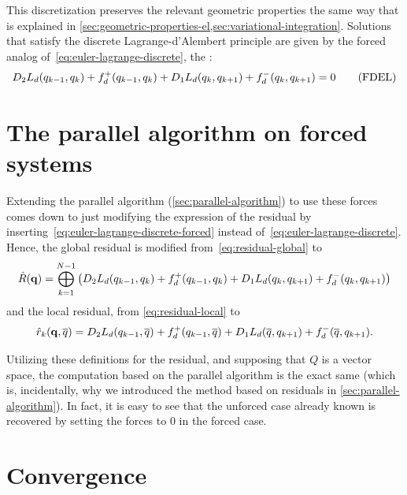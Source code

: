 This discretization preserves the relevant geometric properties the same way that is explained in \cref{sec:geometric-properties-el,sec:variational-integration}.
Solutions that satisfy the discrete Lagrange-d'Alembert principle are given by the forced analog of~\eqref{eq:euler-lagrange-discrete}, the :
\begin{equation}
	D_{2} L_d (q_{k-1}, q_k) + f_d^+ (q_{k-1}, q_k) + D_{1} L_d (q_k, q_{k+1}) + f_d^- (q_k, q_{k+1}) = 0
	\label{eq:euler-lagrange-discrete-forced}
	\tag{FDEL}
\end{equation}

\section{The parallel algorithm on forced systems}

Extending the parallel algorithm (\cref{sec:parallel-algorithm}) to use these forces comes down to just modifying the expression of the residual by inserting~\eqref{eq:euler-lagrange-discrete-forced} instead of~\eqref{eq:euler-lagrange-discrete}. Hence, the global residual is modified from~\eqref{eq:residual-global} to
\begin{equation*}
	\hat{R}(\mathbf{q}) = \bigoplus_{k=1}^{N-1} \left(
	D_{2} L_d (q_{k-1}, q_k) + f_d^+ (q_{k-1}, q_k) + D_{1} L_d (q_k, q_{k+1}) + f_d^- (q_k, q_{k+1})\right)
\end{equation*}
and the local residual, from \cref{eq:residual-local} to
\begin{equation*}
	\hat{r}_k(\mathbf{q}, \overline{q}) =
	D_{2} L_d (q_{k-1}, \overline{q}) + f_d^+ (q_{k-1}, \overline{q}) + D_{1} L_d (\overline{q}, q_{k+1}) + f_d^- (\overline{q}, q_{k+1}).
\end{equation*}

Utilizing these definitions for the residual, and supposing that $Q$ is a vector space, the computation based on the parallel algorithm is the exact same (which is, incidentally, why we introduced the method based on residuals in \cref{sec:parallel-algorithm}). In fact, it is easy to see that the unforced case already known is recovered by setting the forces to $0$ in the forced case.

\section{Convergence}\label{sec:forced-systems-convergence}

